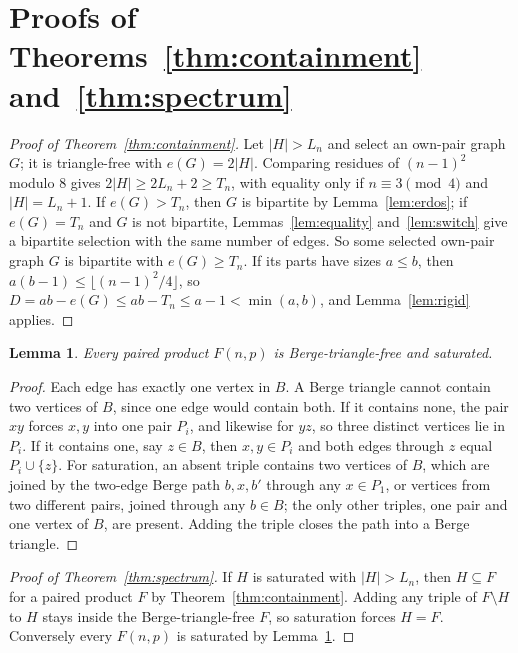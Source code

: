 \documentclass[11pt]{article}
\newtheorem{lemma}[theorem]{Lemma}
\theoremstyle{remark}
\newcommand{\F}{F}
\begin{document}
\section{Proofs of Theorems~\ref{thm:containment} and~\ref{thm:spectrum}}

\begin{proof}[Proof of Theorem~\ref{thm:containment}]
Let $|H|>L_n$ and select an own-pair graph $G$; it is triangle-free with
$e(G)=2|H|$. Comparing residues of $(n-1)^2$ modulo $8$ gives $2|H|\ge
2L_n+2\ge T_n$, with equality only if $n\equiv3\pmod4$ and $|H|=L_n+1$. If
$e(G)>T_n$, then $G$ is bipartite by Lemma~\ref{lem:erdos}; if $e(G)=T_n$
and $G$ is not bipartite, Lemmas~\ref{lem:equality} and~\ref{lem:switch}
give a bipartite selection with the same number of edges. So some selected
own-pair graph $G$ is bipartite with $e(G)\ge T_n$. If its parts have sizes
$a\le b$, then $a(b-1)\le\lfloor (n-1)^2/4\rfloor$, so
$D=ab-e(G)\le ab-T_n\le a-1<\min(a,b)$, and Lemma~\ref{lem:rigid} applies.
\end{proof}

\begin{lemma}\label{lem:product}
Every paired product $\F(n,p)$ is Berge-triangle-free and saturated.
\end{lemma}

\begin{proof}
Each edge has exactly one vertex in $B$. A Berge triangle cannot contain two
vertices of $B$, since one edge would contain both. If it contains none,
the pair $xy$ forces $x,y$ into one pair $P_i$, and likewise for $yz$, so
three distinct vertices lie in $P_i$. If it contains one, say $z\in B$, then
$x,y\in P_i$ and both edges through $z$ equal $P_i\cup\{z\}$. For saturation,
an absent triple contains two vertices of $B$, which are joined by the
two-edge Berge path $b,x,b'$ through any $x\in P_1$, or vertices from two
different pairs, joined through any $b\in B$; the only other triples,
one pair and one vertex of $B$, are present. Adding the triple closes the
path into a Berge triangle.
\end{proof}

\begin{proof}[Proof of Theorem~\ref{thm:spectrum}]
If $H$ is saturated with $|H|>L_n$, then $H\subseteq \F$ for a paired product
$\F$ by Theorem~\ref{thm:containment}. Adding any triple of $\F\setminus H$
to $H$ stays inside the Berge-triangle-free $\F$, so saturation forces
$H=\F$. Conversely every $\F(n,p)$ is saturated by Lemma~\ref{lem:product}.
\end{proof}
\end{document}
